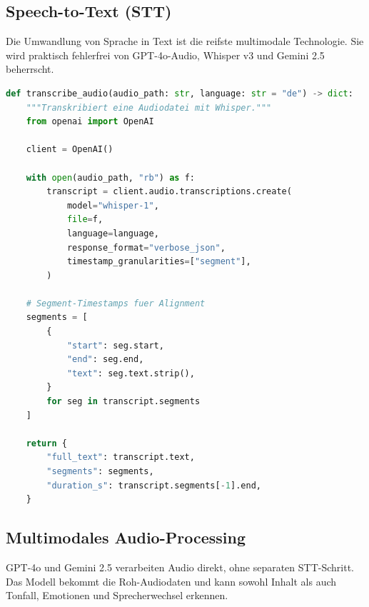 \subsection{Speech-to-Text (STT)}

Die Umwandlung von Sprache in Text ist die reifste multimodale Technologie. Sie wird praktisch fehlerfrei von GPT-4o-Audio, Whisper v3 und Gemini 2.5 beherrscht.

\begin{lstlisting}[language=Python, caption=Audio-Transkription mit Whisper]
def transcribe_audio(audio_path: str, language: str = "de") -> dict:
    """Transkribiert eine Audiodatei mit Whisper."""
    from openai import OpenAI

    client = OpenAI()

    with open(audio_path, "rb") as f:
        transcript = client.audio.transcriptions.create(
            model="whisper-1",
            file=f,
            language=language,
            response_format="verbose_json",
            timestamp_granularities=["segment"],
        )

    # Segment-Timestamps fuer Alignment
    segments = [
        {
            "start": seg.start,
            "end": seg.end,
            "text": seg.text.strip(),
        }
        for seg in transcript.segments
    ]

    return {
        "full_text": transcript.text,
        "segments": segments,
        "duration_s": transcript.segments[-1].end,
    }
\end{lstlisting}

\subsection{Multimodales Audio-Processing}

GPT-4o und Gemini 2.5 verarbeiten Audio direkt, ohne separaten STT-Schritt. Das Modell bekommt die Roh-Audiodaten und kann sowohl Inhalt als auch Tonfall, Emotionen und Sprecherwechsel erkennen.


